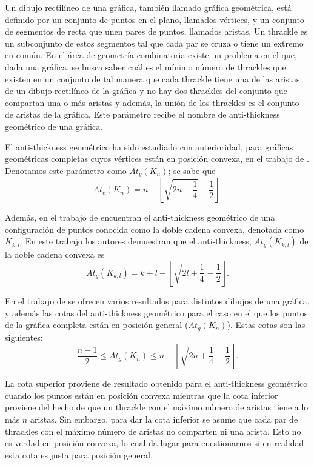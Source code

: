 Un dibujo rectilíneo de una gráfica, también llamado gráfica geométrica, está definido por un conjunto de
puntos en el plano, llamados vértices, y un conjunto de segmentos de recta que unen pares de puntos,
llamados aristas. Un thrackle es un subconjunto de estos segmentos tal que cada par se cruza o tiene un
extremo en común. En el área de geometría combinatoria existe un problema en el que, dada una gráfica, se
busca saber cuál es el mínimo número de thrackles que existen en un conjunto de tal manera que cada
thrackle tiene una de las aristas de un dibujo rectilíneo de la gráfica y no hay dos thrackles del conjunto
que compartan una o más aristas y además, la unión de los thrackles es el conjunto de aristas de la
gráfica. Este parámetro recibe el nombre de anti-thickness geométrico de una gráfica.

El anti-thickness geométrico ha sido estudiado con anterioridad, para gráficas geométricas completas cuyos
vértices están en posición convexa, en el trabajo de \cite{Fabila-Monroy2018}. Denotamos este parámetro
como $At_g(K_n)$; se sabe que \[At_c(K_n) = n - \left\lfloor\sqrt{2n + \frac{1}{4}}-
\frac{1}{2}\right\rfloor.\]

Además, en el trabajo de \cite{Lomeli2018} encuentran el anti-thickness geométrico de una configuración de
puntos conocida como la doble cadena convexa, denotada como $K_{k,l}$. En este trabajo los autores
demuestran que el anti-thickness, $At_g(K_{k,l})$ de la doble cadena convexa es \[ At_g(K_{k,l}) = k+l
-\left\lfloor\sqrt{2l + \frac{1}{4}} -\frac{1}{2}\right\rfloor. \]

En el trabajo de \cite{Dujmovic2017} se ofrecen varios resultados para distintos dibujos de una gráfica, y
además las cotas del anti-thickness geométrico para el caso en el que los puntos de la gráfica completa
están en posición general ($At_g(K_n)$). Estas cotas son las siguientes:
\[ \frac{n-1}{2} \leq At_g(K_n) \leq n - \left\lfloor\sqrt{2n + \frac{1}{4}}- \frac{1}{2}\right\rfloor.\]

La cota superior proviene de resultado obtenido para el anti-thickness geométrico cuando los puntos están
en posición convexa mientras que la cota inferior proviene del hecho de que un thrackle con el máximo
número de aristas tiene a lo más $n$ aristas. Sin embargo, para dar la cota inferior se asume que cada par
de thrackles con el máximo número de aristas no comparten ni una arista. Esto no es verdad en posición
convexa, lo cual da lugar para cuestionarnos si en realidad esta cota es justa para posición general.

